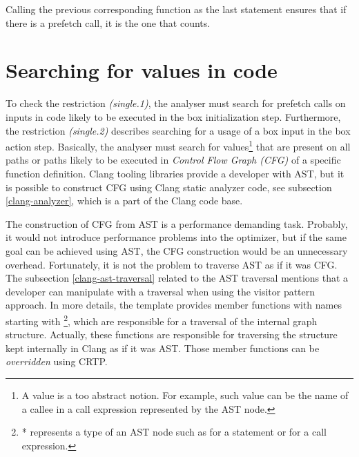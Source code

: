 Calling the previous corresponding  function as the last statement ensures that if there is a prefetch call, it is the one that counts.

\section{Searching for values in code}
To check the restriction \emph{(single.1)}, the analyser must search for prefetch calls on inputs in code likely to be executed in the box initialization step. Furthermore, the restriction \emph{(single.2)} describes searching for a usage of a box input in the box action step. Basically, the analyser must search for values\footnote{A value is a too abstract notion. For example, such value can be the name of a callee in a call expression represented by the  AST node.} that are present on all paths or paths likely to be executed in \emph{Control Flow Graph (CFG)} of a specific function definition. Clang tooling libraries provide a developer with AST, but it is possible to construct CFG using Clang static analyzer code, see subsection \ref{clang-analyzer}, which is a part of the Clang code base.

The construction of CFG from AST is a performance demanding task. Probably, it would not introduce performance problems into the optimizer, but if the same goal can be achieved using AST, the CFG construction would be an unnecessary overhead. Fortunately, it is not the problem to traverse AST as if it was CFG. The subsection \ref{clang-ast-traversal} related to the AST traversal mentions that a developer can manipulate with a traversal when using the visitor pattern approach. In more details, the  template provides member functions with names starting with \footnote{* represents a type of an AST node such as  for a statement or  for a call expression.}, which are responsible for a traversal of the internal graph structure. Actually, these functions are responsible for traversing the structure kept internally in Clang as if it was AST. Those member functions can be \textit{overridden} using CRTP.

